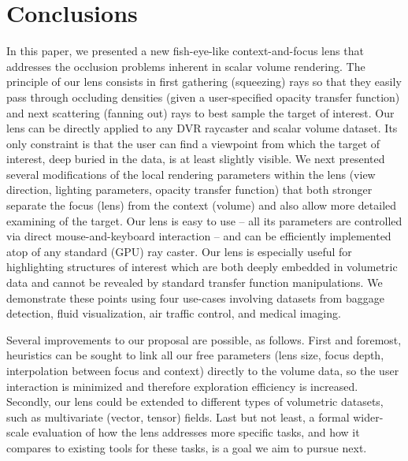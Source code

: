 \section{Conclusions}
\label{sec:conclusions}
%
In this paper, we presented a new fish-eye-like context-and-focus lens that addresses the occlusion problems inherent in scalar volume rendering. The principle of our lens consists in first gathering (squeezing) rays so that they easily pass through occluding densities (given a user-specified opacity transfer function) and next scattering (fanning out) rays to best sample the target of interest. Our lens can be directly applied to any DVR raycaster and scalar volume dataset. Its only constraint is that the user can find a viewpoint from which the target of interest, deep buried in the data, is at least slightly visible. We next presented several modifications of the local rendering parameters within the lens (view direction, lighting parameters, opacity transfer function) that both stronger separate the focus (lens) from the context (volume) and also allow more detailed examining of the target. Our lens is easy to use -- all its parameters are controlled via direct mouse-and-keyboard interaction -- and can be efficiently implemented atop of any standard (GPU) ray caster. Our lens is especially useful for highlighting structures of interest which are both deeply embedded in volumetric data and cannot be revealed by standard transfer function manipulations. We demonstrate these points using four use-cases involving datasets from baggage detection, fluid visualization, air traffic control, and medical imaging.

Several improvements to our proposal are possible, as follows. First and foremost, heuristics can be sought to link all our free parameters (lens size, focus depth, interpolation between focus and context) directly to the volume data, so the user interaction is minimized and therefore exploration efficiency is increased. Secondly, our lens could be extended to different types of volumetric datasets, such as multivariate (vector, tensor) fields. Last but not least, a formal wider-scale evaluation of how the lens addresses more specific tasks, and how it compares to existing tools for these tasks, is a goal we aim to pursue next.
